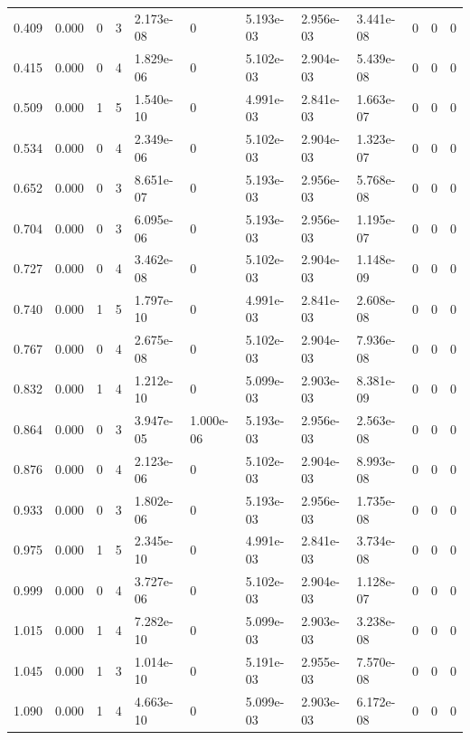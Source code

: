\documentclass[preview]{standalone}
\begin{document}
{{\begin{tabular}{L{1.2cm}C{1.2cm} C{0.3cm}C{0.5cm} C{1.4cm}C{1.4cm} C{1.4cm}C{1.4cm} C{1.6cm}C{1.6cm} C{1.6cm}C{1.6cm}}
  0.409  &  0.000  & 0     &  3 &  2.173e-08  & 0  &  5.193e-03&   2.956e-03& 3.441e-08 & 0   &  0 & 0  \\ 
  0.415  &  0.000  & 0     &  4 &  1.829e-06  & 0  &  5.102e-03&   2.904e-03& 5.439e-08 & 0   &  0 & 0  \\ 
  0.509  &  0.000  & 1     &  5 &  1.540e-10  & 0  &  4.991e-03&   2.841e-03& 1.663e-07 & 0   &  0 & 0  \\ 
  0.534  &  0.000  & 0     &  4 &  2.349e-06  & 0  &  5.102e-03&   2.904e-03& 1.323e-07 & 0   &  0 & 0  \\ 
  0.652  &  0.000  & 0     &  3 &  8.651e-07  & 0  &  5.193e-03&   2.956e-03& 5.768e-08 & 0   &  0 & 0  \\ 
  0.704  &  0.000  & 0     &  3 &  6.095e-06  & 0  &  5.193e-03&   2.956e-03& 1.195e-07 & 0   &  0 & 0  \\ 
  0.727  &  0.000  & 0     &  4 &  3.462e-08  & 0  &  5.102e-03&   2.904e-03& 1.148e-09 & 0   &  0 & 0  \\ 
  0.740  &  0.000  & 1     &  5 &  1.797e-10  & 0  &  4.991e-03&   2.841e-03& 2.608e-08 & 0   &  0 & 0  \\ 
  0.767  &  0.000  & 0     &  4 &  2.675e-08  & 0  &  5.102e-03&   2.904e-03& 7.936e-08 & 0   &  0 & 0  \\ 
  0.832  &  0.000  & 1     &  4 &  1.212e-10  & 0  &  5.099e-03&   2.903e-03& 8.381e-09 & 0   &  0 & 0  \\ 
  0.864  &  0.000  & 0     &  3 &  3.947e-05  & 1.000e-06  &  5.193e-03&   2.956e-03& 2.563e-08 & 0   &  0 & 0  \\ 
  0.876  &  0.000  & 0     &  4 &  2.123e-06  & 0  &  5.102e-03&   2.904e-03& 8.993e-08 & 0   &  0 & 0  \\ 
  0.933  &  0.000  & 0     &  3 &  1.802e-06  & 0  &  5.193e-03&   2.956e-03& 1.735e-08 & 0   &  0 & 0  \\ 
  0.975  &  0.000  & 1     &  5 &  2.345e-10  & 0  &  4.991e-03&   2.841e-03& 3.734e-08 & 0   &  0 & 0  \\ 
  0.999  &  0.000  & 0     &  4 &  3.727e-06  & 0  &  5.102e-03&   2.904e-03& 1.128e-07 & 0   &  0 & 0  \\ 
  1.015  &  0.000  & 1     &  4 &  7.282e-10  & 0  &  5.099e-03&   2.903e-03& 3.238e-08 & 0   &  0 & 0  \\ 
  1.045  &  0.000  & 1     &  3 &  1.014e-10  & 0  &  5.191e-03&   2.955e-03& 7.570e-08 & 0   &  0 & 0  \\ 
  1.090  &  0.000  & 1     &  4 &  4.663e-10  & 0  &  5.099e-03&   2.903e-03& 6.172e-08 & 0   &  0 & 0  \\ 

\end{tabular}}}
\end{document}
